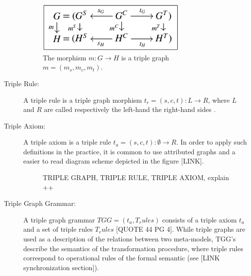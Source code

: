 \documentclass[tuberlin,cic,tc,openright,english,noabntcite]{iiufrgs}
\begin{document}
\begin{description}
\begin{figure}[h]
    \caption{The morphism $m: G \rightarrow H$ is a triple graph $m = (m_s,m_c,m_t)$.}
    \begin{center}
        \includegraphics[width=20em]{tg_morphism}   
    \end{center}
    \label{fig:tg_morphism}
\end{figure}

\item[Triple Rule:] A triple rule is a triple graph morphism $t_r = (s, c, t) : L \rightarrow R$, where $L$ and $R$ are called respectively the left-hand the right-hand sides \citep{ehrig2007information}.

\item[Triple Axiom:] A triple axiom is a triple rule $t_a = (s, c, t) : \emptyset \rightarrow R$. In order to apply such definitions in the practice, it is common to use attributed graphs and a easier to read diagram scheme depicted in the figure [LINK].

\begin{figure}[h]
    \caption{TRIPLE GRAPH, TRIPLE RULE, TRIPLE AXIOM, explain ++}
    \begin{center}
    \end{center}
    \label{fig:triple_rules}
\end{figure}

\item[Triple Graph Grammar:] A triple graph grammar $TGG = (t_a, T_rules) $ consists of a triple axiom $t_a$ and a set of triple rules $T_rules$ [QUOTE 44 PG 4]. While triple graphs are used as a description of the relations between two meta-models, TGG's describe the semantics of the transformation procedure, where triple rules correspond to operational rules of the formal semantic (see [LINK synchronization section]).


\end{description}
\end{document}
